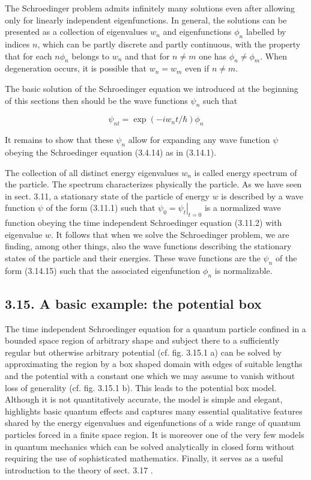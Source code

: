 \documentclass{article}
\begin{document}
The Schroedinger problem admits infinitely many solutions even after allowing only for linearly independent eigenfunctions. In general, the solutions can be presented as a collection of eigenvalues $w_{n}$ and eigenfunctions $\phi_{n}$ labelled by indices $n$, which can be partly discrete and partly continuous, with the property that for each $n \phi_{n}$ belongs to $w_{n}$ and that for $n \neq m$ one has $\phi_{n} \neq \phi_{m}$. When degeneration occurs, it is possible that $w_{n}=w_{m}$ even if $n \neq m$.

The basic solution of the Schroedinger equation we introduced at the beginning of this sections then should be the wave functions $\psi_{n}$ such that
 
\begin{equation*}
\psi_{n t}=\exp \left(-i w_{n} t / \hbar\right) \phi_{n} \tag{3.14.15}
\end{equation*}
 

It remains to show that these $\psi_{n}$ allow for expanding any wave function $\psi$ obeying the Schroedinger equation (3.4.14) as in (3.14.1).

The collection of all distinct energy eigenvalues $w_{n}$ is called energy spectrum of the particle. The spectrum characterizes physically the particle. As we have seen in sect. 3.11, a stationary state of the particle of energy $w$ is described by a wave function $\psi$ of the form (3.11.1) such that $\psi_{0}=\left.\psi_{t}\right|_{t=0}$ is a normalized wave function obeying the time independent Schroedinger equation (3.11.2) with eigenvalue $w$. It follows that when we solve the Schroedinger problem, we are finding, among other things, also the wave functions describing the stationary states of the particle and their energies. These wave functions are the $\psi_{n}$ of the form (3.14.15) such that the associated eigenfunction $\phi_{n}$ is normalizable.

\subsection*{3.15. A basic example: the potential box}

The time independent Schroedinger equation for a quantum particle confined in a bounded space region of arbitrary shape and subject there to a sufficiently regular but otherwise arbitrary potential (cf. fig. 3.15.1 a) can be solved by approximating the region by a box shaped domain with edges of suitable lengths and the potential with a constant one which we may assume to vanish without loss of generality (cf. fig. 3.15.1 b). This leads to the potential box model. Although it is not quantitatively accurate, the model is simple and elegant, highlights basic quantum effects and captures many essential qualitative features shared by the energy eigenvalues and eigenfunctions of a wide range of quantum particles forced in a finite space region. It is moreover one of the very few models in quantum mechanics which can be solved analytically in closed form without requiring the use of sophisticated mathematics. Finally, it serves as a useful introduction to the theory of sect. 3.17 .
\end{document}
